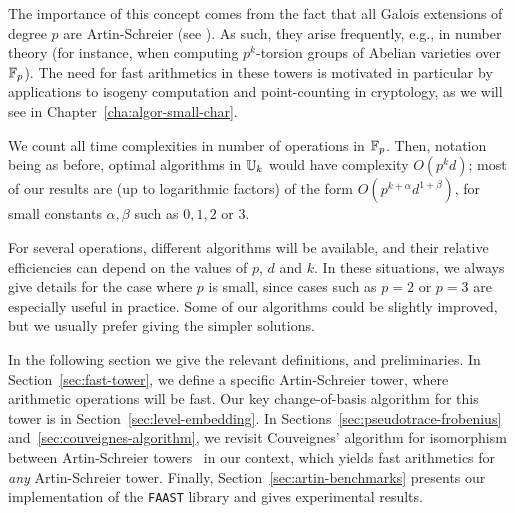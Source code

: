 The importance of this concept comes from the fact that all Galois
extensions of degree $p$ are Artin-Schreier (see \cite[VI,
$\S6$]{lang}). As such, they arise frequently, e.g., in number theory
(for instance, when computing $p^k$-torsion groups of Abelian
varieties over $\mathbb{F}_p$). The need for fast arithmetics in these towers
is motivated in particular by applications to isogeny computation and
point-counting in cryptology, as we will see in
Chapter~\ref{cha:algor-small-char}.

We count all time complexities in number of operations in
$\mathbb{F}_p$. Then, notation being as before, optimal algorithms in $\mathbb{U}_k$
would have complexity $O(p^kd)$; most of our results are (up to
logarithmic factors) of the form $O(p^{k+\alpha} d^{1+\beta})$, for
small constants $\alpha,\beta$ such as $0,1,2$ or $3$.

For several operations, different algorithms will be available, and
their relative efficiencies can depend on the values of $p$, $d$ and
$k$. In these situations, we always give details for the case where
$p$ is small, since cases such as $p=2$ or $p=3$ are especially useful
in practice. Some of our algorithms could be slightly
improved, but we usually prefer giving the simpler solutions.

In the following section we give the relevant definitions, and
preliminaries. In Section~\ref{sec:fast-tower}, we define a specific
Artin-Schreier tower, where arithmetic operations will be fast. Our
key change-of-basis algorithm for this tower is in
Section~\ref{sec:level-embedding}. In
Sections~\ref{sec:pseudotrace-frobenius}
and~\ref{sec:couveignes-algorithm}, we revisit Couveignes' algorithm
for isomorphism between Artin-Schreier towers~\cite{couveignes00} in
our context, which yields fast arithmetics for {\em any}
Artin-Schreier tower. Finally, Section~\ref{sec:artin-benchmarks} presents
our implementation of the \texttt{FAAST} library and gives
experimental results.



%
